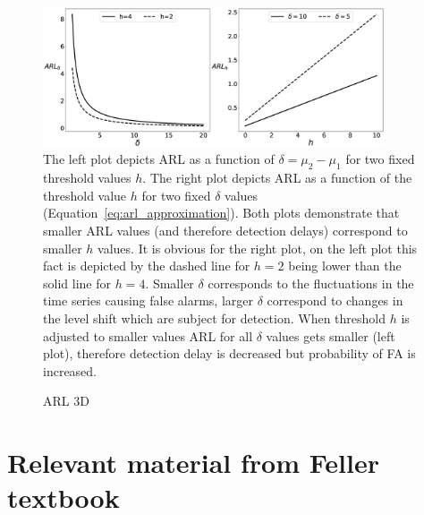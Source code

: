 \begin{figure}[!htb]
	\centering
	\includegraphics[width=0.9\textwidth]{images/images_ecmplpkdd/arl.eps}
	\caption{
    The left plot depicts ARL as a function of $\delta = \mu_2-\mu_1$ for two fixed threshold values $h$. The right plot depicts ARL as a function of the threshold value $h$ for two fixed $\delta$ values (Equation~\ref{eq:arl_approximation}).
    Both plots demonstrate that smaller ARL values (and therefore detection delays) correspond to smaller $h$ values. It is obvious for the right plot, on the left plot this fact is depicted by the dashed line for $h=2$ being lower than the solid line for $h=4$.
    Smaller $\delta$ corresponds to the fluctuations in the time series causing false alarms, larger $\delta$ correspond to changes in the level shift which are subject for detection.
    When threshold $h$ is adjusted to smaller values ARL for all $\delta$ values gets smaller (left plot), therefore detection delay is decreased but probability of FA is increased.
}\label{fig:arl}
\end{figure}
\begin{figure}[!htb]

\caption{ARL 3D}\label{fig:arl3d}
\end{figure}


\section{Relevant material from Feller textbook}

